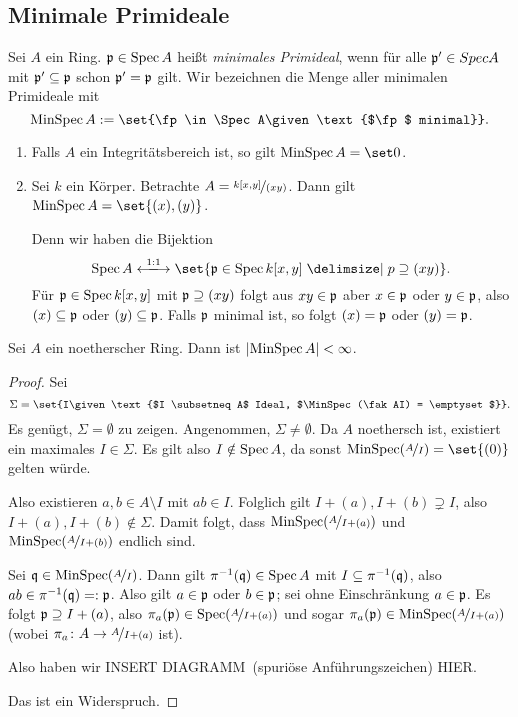 \documentclass[12pt,a4paper]{scrartcl}
\theoremstyle{cplain}
\theoremstyle{cdef}
\begin{document}
\subsection{Minimale Primideale}
\begin{defi} Sei $A$ ein Ring. $\mathfrak{p}\in \operatorname{Spec} A$ heißt \emph{minimales Primideal}, wenn für alle $\mathfrak{p}'\in Spec A$ mit $\mathfrak{p}'\subseteq \mathfrak{p}$ schon $\mathfrak{p}' = \mathfrak{p}$ gilt. Wir bezeichnen die Menge aller minimalen Primideale mit \[\MinSpec A := \set{\fp\in\Spec A\given \text{$\fp$ minimal}}.\]
\end{defi}
\begin{bsp}
	\leavevmode
	\begin{enumerate}
		\item Falls $A$ ein Integritätsbereich ist, so gilt $ \MinSpec A = \set 0$.
		\item Sei $k$ ein Körper. Betrachte $A = \nicefrac{k[x,y]}{(xy)}$. Dann gilt $\MinSpec A = \set{(x), (y)}$.
		
		Denn wir haben die Bijektion \[\Spec A \xlongleftrightarrow{1:1}\set {\fp\in\Spec k[x,y]\given p\supseteq (xy)}.\]
		Für $\mathfrak{p}\in \operatorname{Spec} k[x,y]$ mit $\mathfrak{p}\supseteq (xy)$ folgt aus  $xy\in \mathfrak{p}$ aber $ x\in \mathfrak{p}$ oder $y \in\mathfrak{p}$, also $(x)\subseteq \mathfrak{p}$ oder $(y)\subseteq \mathfrak{p}$. Falls $\mathfrak{p}$ minimal ist, so folgt $(x) = \mathfrak{p}$ oder $(y) = \mathfrak{p}$.
	\end{enumerate}
\end{bsp}
\begin{satz}
	Sei $A$ ein noetherscher Ring. Dann ist $\lvert\operatorname{MinSpec} A\rvert<\infty$.
\end{satz}
\begin{proof}
	Sei \[\Sigma = \set{I\given \text{$I \subsetneq A$ Ideal, $\MinSpec(\fak AI) = \emptyset$}}.\] Es genügt, $\Sigma = \emptyset$ zu zeigen. Angenommen, $\Sigma \neq \emptyset$. Da $A$ noethersch ist, existiert ein maximales $I\in \Sigma$. Es gilt also $I\notin \operatorname{Spec} A$, da sonst $\MinSpec(\fak{A}I) = \set {(0)}$ gelten würde. 
	
	Also existieren $a,b\in A\setminus I$ mit $ab\in I$. Folglich gilt $I+(a), I+(b)\supsetneq I$, also $I+(a), I+(b)\notin \Sigma$. Damit folgt, dass $\operatorname{MinSpec}(\nicefrac{A}{I+(a)})$ und $ \operatorname{MinSpec}(\nicefrac{A}{I+(b)})$ endlich sind.
	
	Sei $\mathfrak{q}\in\operatorname{MinSpec}(\nicefrac{A}{I})$. Dann gilt $\pi^{-1}(\mathfrak{q})\in \operatorname{Spec} A$ mit $I\subseteq \pi^{-1}(\mathfrak{q})$, also $ab\in \pi^{-1}(\mathfrak{q}) =: \mathfrak{p}$. Also gilt $a\in \mathfrak{p}$ oder $b\in \mathfrak{p}$; sei ohne Einschränkung $a\in \mathfrak{p}$. Es folgt $\mathfrak{p}\supseteq I+(a)$, also $\pi_a(\mathfrak{p}) \in\operatorname{Spec}(\nicefrac{A}{I+(a)})$ und sogar $\pi_{a}(\mathfrak{p}) \in \operatorname{MinSpec}(\nicefrac{A}{I+(a)})$ (wobei $\pi_a\colon A\to \nicefrac{A}{I+(a)}$ ist).
	
	Also haben wir
	INSERT \glqq DIAGRAMM\grqq\ (spuriöse Anführungszeichen) HIER.
	
	Das ist ein Widerspruch.
\end{proof}
\end{document}

